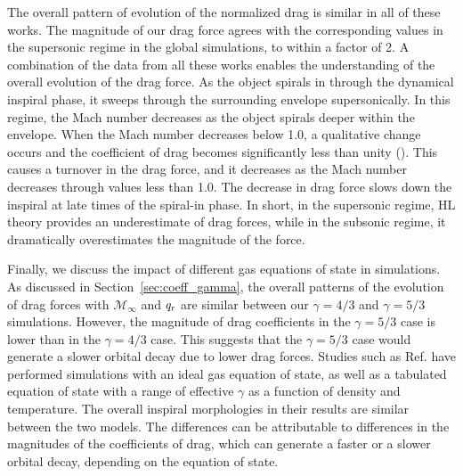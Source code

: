 The overall pattern of evolution of the normalized drag is similar in all of these works. The magnitude of our drag force agrees with the corresponding values in the supersonic regime in the global simulations, to within a factor of 2. A combination of the data from all these works enables the understanding of the overall evolution of the drag force. As the object spirals in through the dynamical inspiral phase, it sweeps through the surrounding envelope supersonically. In this regime, the Mach number decreases as the object spirals deeper within the envelope. When the Mach number decreases below 1.0, a qualitative change occurs and the coefficient of drag becomes significantly less than unity (\cite{Shima:1985,1999ApJ...513..252O}). This causes a turnover in the drag force, and it decreases as the Mach number decreases through values less than 1.0. The decrease in drag force slows down the inspiral at late times of the spiral-in phase. In short, in the supersonic regime, HL theory provides an underestimate of drag forces, while in the subsonic regime, it dramatically overestimates the magnitude of the force.

Finally, we discuss the impact of different gas equations of state in simulations. As discussed in Section~\ref{sec:coeff_gamma}, the overall patterns of the evolution of drag forces with $\mathcal{M}_\infty$ and $q_{\rm r}$ are similar between our $\gamma = 4/3$ and $\gamma = 5/3$ simulations. However, the magnitude of drag coefficients in the $\gamma = 5/3$ case is lower than in the $\gamma = 4/3$ case. This suggests that the $\gamma = 5/3$ case would generate a slower orbital decay due to lower drag forces. Studies such as Ref. \cite{Reichardt:2019b} have performed simulations with an ideal gas equation of state, as well as a tabulated equation of state with a range of effective $\gamma$ as a function of density and temperature. The overall inspiral morphologies in their results are similar between the two models. The differences can be attributable to differences in the magnitudes of the coefficients of drag, which can generate a faster or a slower orbital decay, depending on the equation of state.


